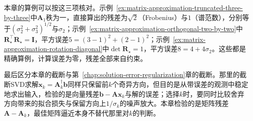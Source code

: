 本章的算例可以按这三项核对。示例~\ref{ex:matrix-approximation-truncated-three-by-three}中$\bm A_1$秩为一，直接算出的残差为$\sqrt2$（Frobenius）与$1$（谱范数），分别等于$(\sigma_2^2+\sigma_3^2)^{1/2}$与$\sigma_2$；示例~\ref{ex:matrix-approximation-orthogonal-two-by-two}中$\bm R_\star^\top\bm R_\star=\bm I$，平方误差$5=(3-1)^2+(2-1)^2$；示例~\ref{ex:matrix-approximation-rotation-diagonal}中$\det\bm R_\star=1$，平方误差$8=4+4\sigma_2$。这些都是精确算例，计算误差为零，残差全部来自约束。

最后区分本章的截断与第~\ref{chap:solution-error-regularization}章的截断。那里的截断SVD求解$\bm x_k=\bm A_k^\dagger\bm b$同样只保留前$k$个奇异方向，但目的是从带误差的观测中稳定地求出输入，检验的是向量残差$\bm b-\bm A\bm x_k$与解的误差；选择$k$时，要同时比较舍弃方向带来的拟合损失与保留方向上$1/\sigma_k$的噪声放大。本章检验的是矩阵残差$\bm A-\bm A_k$，最佳矩阵逼近本身不替代那里对$k$的判断。
